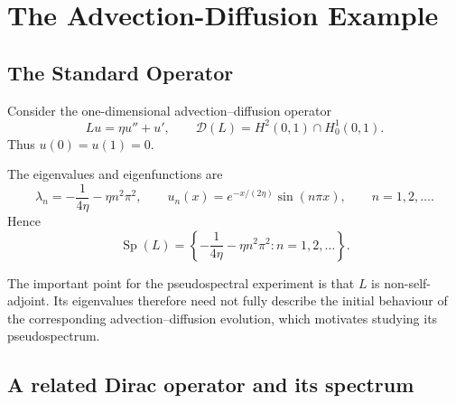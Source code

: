 \documentclass[12pt,a4paper]{article}
\newcommand{\D}{\mathcal{D}}
\newcommand{\Sp}{\operatorname{Sp}}
\begin{document}
\section{The Advection-Diffusion Example}

\subsection{The Standard Operator}

Consider the one-dimensional advection--diffusion operator
\begin{equation}
    Lu=\eta u''+u',
    \qquad
    \D(L)=H^2(0,1)\cap H_0^1(0,1).
    \label{eq:L}
\end{equation}
Thus $u(0)=u(1)=0$.

The eigenvalues and eigenfunctions are
\begin{equation}
    \lambda_n
    =-\frac{1}{4\eta}-\eta n^2\pi^2,
    \qquad
    u_n(x)=e^{-x/(2\eta)}\sin(n\pi x),
    \qquad n=1,2,\ldots.
    \label{eq:Lspec}
\end{equation}
Hence
\begin{equation}
    \Sp(L)
    =\left\{-\frac{1}{4\eta}-\eta n^2\pi^2:
      n=1,2,\ldots\right\}.
\end{equation}

The important point for the pseudospectral experiment is that $L$ is non-self-adjoint.  Its eigenvalues therefore need not fully describe the initial behaviour of the corresponding advection--diffusion evolution, which motivates studying its pseudospectrum.

\subsection{A related Dirac operator and its spectrum}
\end{document}
